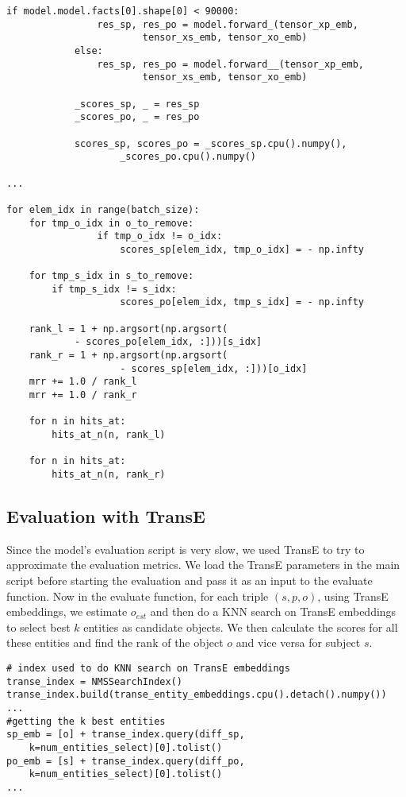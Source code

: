 \documentclass[Other]{iitddiss}
\begin{document}
\begin{lstlisting}
if model.model.facts[0].shape[0] < 90000:
                res_sp, res_po = model.forward_(tensor_xp_emb, 
                		tensor_xs_emb, tensor_xo_emb)
            else:
                res_sp, res_po = model.forward__(tensor_xp_emb, 
                		tensor_xs_emb, tensor_xo_emb)

            _scores_sp, _ = res_sp
            _scores_po, _ = res_po

            scores_sp, scores_po = _scores_sp.cpu().numpy(), 
            		_scores_po.cpu().numpy()
		
...

for elem_idx in range(batch_size):
	for tmp_o_idx in o_to_remove:
                if tmp_o_idx != o_idx:
                    scores_sp[elem_idx, tmp_o_idx] = - np.infty

	for tmp_s_idx in s_to_remove:
		if tmp_s_idx != s_idx:
                    scores_po[elem_idx, tmp_s_idx] = - np.infty

	rank_l = 1 + np.argsort(np.argsort(
			- scores_po[elem_idx, :]))[s_idx]
	rank_r = 1 + np.argsort(np.argsort(
            		- scores_sp[elem_idx, :]))[o_idx]             
	mrr += 1.0 / rank_l
	mrr += 1.0 / rank_r

	for n in hits_at:
		hits_at_n(n, rank_l)

	for n in hits_at:
		hits_at_n(n, rank_r)
\end{lstlisting}

\subsection{Evaluation with TransE}
Since the model's evaluation script is very slow, we used TransE to try to approximate the evaluation metrics. We load the TransE parameters in the main script before starting the evaluation and pass it as an input to the evaluate function. Now in the evaluate function, for each triple \((s, p, o)\), using TransE embeddings, we estimate \(o_{est}\) and then do a KNN search on TransE embeddings to select best \(k\) entities as candidate objects. We then calculate the scores for all these entities and find the rank of the object \(o\) and vice versa for subject \(s\). 

\begin{lstlisting}
# index used to do KNN search on TransE embeddings
transe_index = NMSSearchIndex()
transe_index.build(transe_entity_embeddings.cpu().detach().numpy())
...
#getting the k best entities
sp_emb = [o] + transe_index.query(diff_sp, 
	k=num_entities_select)[0].tolist()
po_emb = [s] + transe_index.query(diff_po, 
	k=num_entities_select)[0].tolist()
...
\end{lstlisting}
\end{document}
